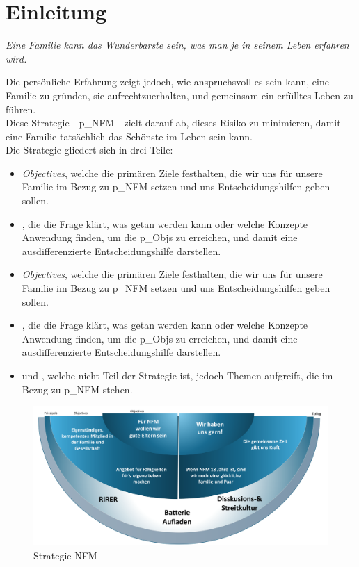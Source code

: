 \renewcommand{\abstractname}{Abstract}

\section{Einleitung}
\begin{center}
	\textit{Eine Familie kann das Wunderbarste sein, was man je in seinem Leben erfahren wird.}
\end{center}

Die persönliche Erfahrung zeigt jedoch, wie anspruchsvoll es sein kann, eine Familie zu gründen, sie aufrechtzuerhalten, und gemeinsam ein erfülltes Leben zu führen.\\


Diese Strategie - \gls{p_NFM} - zielt darauf ab, dieses Risiko zu minimieren, damit eine Familie tatsächlich das Schönste im Leben sein kann.\\


Die Strategie gliedert sich in drei Teile:
\begin{itemize}
	\item \textit{Objectives}, welche die primären Ziele festhalten, die wir uns für unsere Familie im Bezug zu \gls{p_NFM} setzen und uns Entscheidungshilfen geben sollen.
	\item \textit{}, die die Frage klärt, was getan werden kann oder welche Konzepte Anwendung finden, um die \glspl{p_Obj} zu erreichen, und damit eine ausdifferenzierte Entscheidungshilfe darstellen.
	\item \textit{Objectives}, welche die primären Ziele festhalten, die wir uns für unsere Familie im Bezug zu \gls{p_NFM} setzen und uns Entscheidungshilfen geben sollen.
	\item \textit{}, die die Frage klärt, was getan werden kann oder welche Konzepte Anwendung finden, um die \glspl{p_Obj} zu erreichen, und damit eine ausdifferenzierte Entscheidungshilfe darstellen.
	\item und \textit{}, welche nicht Teil der Strategie ist, jedoch Themen aufgreift, die im Bezug zu \gls{p_NFM} stehen.
\end{itemize}

\begin{figure}[H]
	\centering
	\includegraphics[scale = 0.4]{attachment/chapter_OWN/Scc010.png}
	\caption{Strategie NFM}
\end{figure} 



